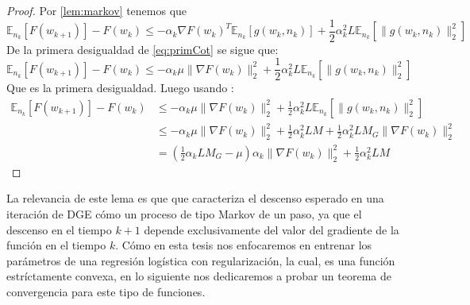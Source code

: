 \documentclass{book}
\theoremstyle{plain}
\theoremstyle{definition}
\theoremstyle{remark}
\begin{document}
\begin{proof}
Por \ref{lem:markov} tenemos que
\begin{equation*}
      \mathbb{E}_{n_k}[F(w_{k+1})] - F(w_{k}) \leq -\alpha_k\nabla F(w_{k})^T\mathbb{E}_{n_k}[g(w_{k}, n_{k})]+\frac{1}{2}\alpha^2_kL\mathbb{E}_{n_k}[\|g(w_{k}, n_{k})\|_2^2]
\end{equation*}
De la primera desigualdad de \ref{eq:primCot} se sigue que:
\begin{equation*}
      \mathbb{E}_{n_k}[F(w_{k+1})] - F(w_{k}) \leq -\alpha_k\mu\|\nabla F(w_k)\|_2^2 +\frac{1}{2}\alpha^2_kL\mathbb{E}_{n_k}[\|g(w_{k}, n_{k})\|_2^2]
\end{equation*}
Que es la primera desigualdad. Luego usando \label{eq:secCot1}:
\begin{equation*}
    \begin{split}
      \mathbb{E}_{n_k}[F(w_{k+1})] - F(w_{k}) & \leq -\alpha_k\mu\|\nabla F(w_k)\|_2^2 +\frac{1}{2}\alpha^2_kL\mathbb{E}_{n_k}[\|g(w_{k}, n_{k})\|_2^2]\\
      & \leq  -\alpha_k\mu\|\nabla F(w_k)\|_2^2 + \frac{1}{2}\alpha^2_kLM + \frac{1}{2}\alpha^2_kLM_G\|\nabla F(w_k)\|_2^2\\
      & = (\frac{1}{2}\alpha_kLM_G-\mu)\alpha_k\|\nabla F(w_k)\|_2^2 + \frac{1}{2}\alpha^2_kLM
     \end{split}
\end{equation*}
\end{proof}

La relevancia de este lema es que que caracteriza el descenso esperado en una iteración de DGE cómo un proceso de tipo Markov de un paso, ya que el descenso en el tiempo $k+1$ depende exclusivamente del valor del gradiente de la función en el tiempo $k$. Cómo en esta tesis nos enfocaremos en entrenar los parámetros de una regresión logística con regularización, la cual, es una función estríctamente convexa, en lo siguiente nos dedicaremos a probar un teorema de convergencia para este tipo de funciones.
\end{document}
